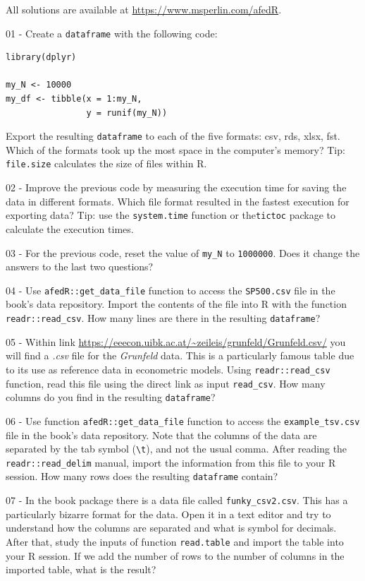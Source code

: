 \documentclass[
  12pt,
]{book}
\begin{document}
All solutions are available at \url{https://www.msperlin.com/afedR}.

01 -
Create a \texttt{dataframe} with the following code:

\begin{verbatim}
library(dplyr)

my_N <- 10000
my_df <- tibble(x = 1:my_N,
                y = runif(my_N))
\end{verbatim}

Export the resulting \texttt{dataframe} to each of the five formats: csv, rds, xlsx, fst. Which of the formats took up the most space in the computer's memory? Tip: \texttt{file.size} calculates the size of files within R.

02 -
Improve the previous code by measuring the execution time for saving the data in different formats. Which file format resulted in the fastest execution for exporting data? Tip: use the \texttt{system.time} function or the\texttt{tictoc} package to calculate the execution times.

03 -
For the previous code, reset the value of \texttt{my\_N} to \texttt{1000000}. Does it change the answers to the last two questions?

04 -
Use \texttt{afedR::get\_data\_file} function to access the \texttt{SP500.csv} file in the book's data repository. Import the contents of the file into R with the function \texttt{readr::read\_csv}. How many lines are there in the resulting \texttt{dataframe}?

05 -
Within link \href{https://eeecon.uibk.ac.at/~zeileis/grunfeld/Grunfeld.csv}{https://eeecon.uibk.ac.at/\textasciitilde zeileis/grunfeld/Grunfeld.csv/} you will find a \emph{.csv} file for the \emph{Grunfeld} data. This is a particularly famous table due to its use as reference data in econometric models. Using \texttt{readr::read\_csv} function, read this file using the direct link as input \texttt{read\_csv}. How many columns do you find in the resulting \texttt{dataframe}?

06 -
Use function \texttt{afedR::get\_data\_file} function to access the \texttt{example\_tsv.csv} file in the book's data repository. Note that the columns of the data are separated by the tab symbol (\texttt{\textquotesingle{}\textbackslash{}t\textquotesingle{}}), and not the usual comma. After reading the \texttt{readr::read\_delim} manual, import the information from this file to your R session. How many rows does the resulting \texttt{dataframe} contain?

07 -
In the book package there is a data file called \texttt{\textquotesingle{}funky\_csv2.csv\textquotesingle{}}. This has a particularly bizarre format for the data. Open it in a text editor and try to understand how the columns are separated and what is symbol for decimals. After that, study the inputs of function \texttt{read.table} and import the table into your R session. If we add the number of rows to the number of columns in the imported table, what is the result?
\end{document}
